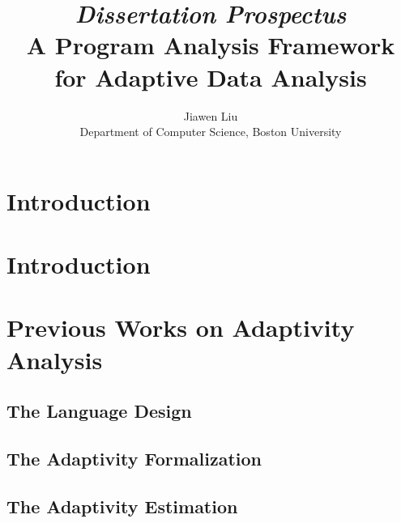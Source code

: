 \documentclass[a4paper,11pt]{article}
\begin{document}
\title{{\em Dissertation Prospectus}
\\ {A Program Analysis Framework for Adaptive Data Analysis}
}

\author{Jiawen Liu\\ Department of Computer Science, Boston University}
\maketitle
\begin{abstract}

\end{abstract}

\clearpage
\tableofcontents{}

\clearpage
\section{Introduction}
\label{sec:introduction}


\section*{}
%

\section{Introduction}
\label{sec:adapt-intro}


\section{Previous Works on Adaptivity Analysis}
\subsection{The Language Design}
\label{sec:prework-language}

%
\subsection{The Adaptivity Formalization}
\label{sec:prework-formalization}

%
\subsection{The Adaptivity Estimation}
\label{sec:prework-static}

\end{document}
